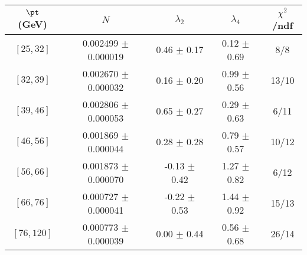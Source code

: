 \begin{tabular}{c||c|c|c|c}
$\pt$ (GeV) & $N$ & $\lambda_{2}$ & $\lambda_4$  & $\chi^2$/ndf  \\
\hline
$[25, 32]$ & 0.002499 $\pm$ 0.000019 & 0.46 $\pm$ 0.17 & 0.12 $\pm$ 0.69 & 8/8\\
$[32, 39]$ & 0.002670 $\pm$ 0.000032 & 0.16 $\pm$ 0.20 & 0.99 $\pm$ 0.56 & 13/10\\
$[39, 46]$ & 0.002806 $\pm$ 0.000053 & 0.65 $\pm$ 0.27 & 0.29 $\pm$ 0.63 & 6/11\\
$[46, 56]$ & 0.001869 $\pm$ 0.000044 & 0.28 $\pm$ 0.28 & 0.79 $\pm$ 0.57 & 10/12\\
$[56, 66]$ & 0.001873 $\pm$ 0.000070 & -0.13 $\pm$ 0.42 & 1.27 $\pm$ 0.82 & 6/12\\
$[66, 76]$ & 0.000727 $\pm$ 0.000041 & -0.22 $\pm$ 0.53 & 1.44 $\pm$ 0.92 & 15/13\\
$[76, 120]$ & 0.000773 $\pm$ 0.000039 & 0.00 $\pm$ 0.44 & 0.56 $\pm$ 0.68 & 26/14\\
\end{tabular}
